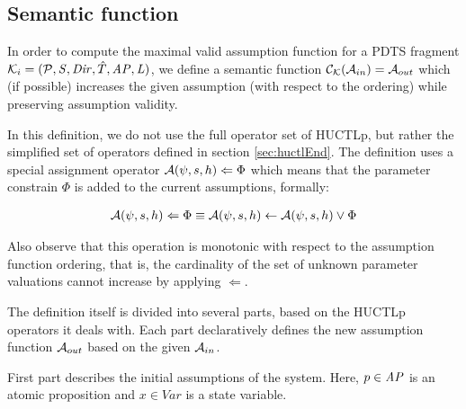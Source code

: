 \subsection{Semantic function}

In order to compute the maximal valid assumption function for a \ac{PDTS} fragment $\mathcal{K}_i = (\mathcal{P}, \mathit{S}, \mathit{Dir}, \hat{T}, \mathit{AP}, \mathit{L})$, we define a semantic function $\mathcal{C}_\mathcal{K}(\mathcal{A}_{in}) = \mathcal{A}_{out}$ which (if possible) increases the given assumption (with respect to the ordering) while preserving assumption validity.

In this definition, we do not use the full operator set of \ac{HUCTLp}, but rather the simplified set of operators defined in section \ref{sec:huctlEnd}. The definition uses a special assignment operator $\mathcal{A}(\psi, s, h) \Leftarrow \Phi$ which means that the parameter constrain $\Phi$ is added to the current assumptions, formally:

\begin{align*}
	\mathcal{A}(\psi, s, h) \Leftarrow \Phi \equiv \mathcal{A}(\psi, s, h) \gets \mathcal{A}(\psi, s, h) \lor \Phi
\end{align*}

Also observe that this operation is monotonic with respect to the assumption function ordering, that is, the cardinality of the set of unknown parameter valuations cannot increase by applying $\Leftarrow$.

The definition itself is divided into several parts, based on the \ac{HUCTLp} operators it deals with. Each part declaratively defines the new assumption function $\mathcal{A}_{out}$ based on the given $\mathcal{A}_{in}$.

First part describes the initial assumptions of the system. Here, $p \in \mathit{AP}$ is an atomic proposition and $x \in Var$ is a state variable.

